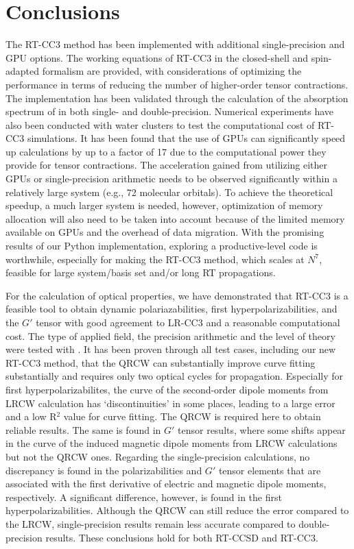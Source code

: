 \section{Conclusions}\label{conc_cc3}
The RT-CC3 method has been implemented with additional single-precision and GPU options. The working equations of RT-CC3 in the closed-shell and spin-adapted formalism are provided, with considerations of optimizing the performance in terms of reducing the number of higher-order tensor contractions. The implementation has been validated through the calculation of the absorption spectrum of  in both single- and double-precision. Numerical experiments have also been conducted with water clusters to test the computational cost of RT-CC3 simulations. It has been found that the use of GPUs can significantly speed up calculations by up to a factor of 17 due to the computational power they provide for tensor contractions. The acceleration gained from utilizing either GPUs or single-precision arithmetic needs to be observed significantly within a relatively large system (e.g., 72 molecular orbitals). To achieve the theoretical speedup, a much larger system is needed, however, optimization of memory allocation will also need to be taken into account because of the limited memory available on GPUs and the overhead of data migration. With the promising results of our Python implementation, exploring a productive-level code is worthwhile, especially for making the RT-CC3 method, which scales at $N^{7}$, feasible for large system/basis set and/or long RT propagations.  

For the calculation of optical properties, we have demonstrated that RT-CC3 is a feasible tool to obtain dynamic polariazabilities, first hyperpolarizabilities, and the $G'$ tensor with good agreement to LR-CC3 and a reasonable computational cost. The type of applied field, the precision arithmetic and the level of theory were tested with . It has been proven through all test cases, including our new RT-CC3 method, that the QRCW can substantially improve curve fitting substantially and requires only two optical cycles for propagation. Especially for first hyperpolarizabilites, the curve of the second-order dipole moments from LRCW calculation has `discontinuities' in some places, leading to a large error and a low R$^{2}$ value for curve fitting. The QRCW is required here to obtain reliable results. The same is found in $G'$ tensor results, where some shifts appear in the curve of the induced magnetic dipole moments from LRCW calculations but not the QRCW ones. Regarding the single-precision calculations, no discrepancy is found in the polarizabilities and $G'$ tensor elements that are associated with the first derivative of electric and magnetic dipole moments, respectively. A significant difference, however, is found in the first hyperpolarizabilities. Although the QRCW can still reduce the error compared to the LRCW, single-precision results remain less accurate compared to double-precision results. These conclusions hold for both RT-CCSD and RT-CC3. 

